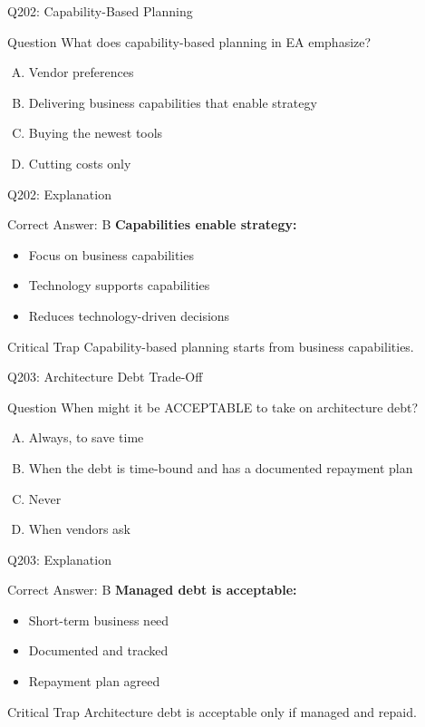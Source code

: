 \documentclass{beamer}
\begin{document}
	\begin{frame}{Q202: Capability-Based Planning}
		\begin{block}{Question}
			What does capability-based planning in EA emphasize?
		\end{block}
		\begin{enumerate}[(A)]
			\item Vendor preferences
			\item Delivering business capabilities that enable strategy
			\item Buying the newest tools
			\item Cutting costs only
		\end{enumerate}
	\end{frame}
	
	\begin{frame}{Q202: Explanation}
		\begin{block}{Correct Answer: B}
			\textbf{Capabilities enable strategy:}
			\begin{itemize}
				\item Focus on business capabilities
				\item Technology supports capabilities
				\item Reduces technology-driven decisions
			\end{itemize}
		\end{block}
		\begin{alertblock}{Critical Trap}
			Capability-based planning starts from business capabilities.
		\end{alertblock}
	\end{frame}
	
	\begin{frame}{Q203: Architecture Debt Trade-Off}
		\begin{block}{Question}
			When might it be ACCEPTABLE to take on architecture debt?
		\end{block}
		\begin{enumerate}[(A)]
			\item Always, to save time
			\item When the debt is time-bound and has a documented repayment plan
			\item Never
			\item When vendors ask
		\end{enumerate}
	\end{frame}
	
	\begin{frame}{Q203: Explanation}
		\begin{block}{Correct Answer: B}
			\textbf{Managed debt is acceptable:}
			\begin{itemize}
				\item Short-term business need
				\item Documented and tracked
				\item Repayment plan agreed
			\end{itemize}
		\end{block}
		\begin{alertblock}{Critical Trap}
			Architecture debt is acceptable only if managed and repaid.
		\end{alertblock}
	\end{frame}
	
\end{document}
